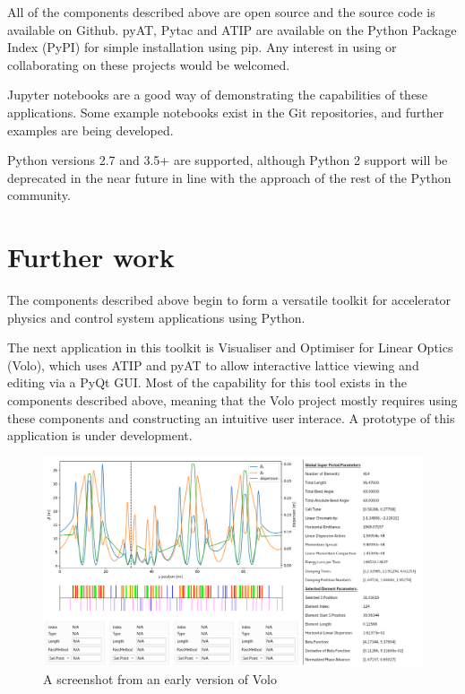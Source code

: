\documentclass[a4paper,
               keeplastbox,   %
               ]{jacow}
\begin{document}
All of the components described above are open source and the source code is available
on Github. pyAT, Pytac and ATIP are available on the Python Package Index (PyPI) \cite{pypi} 
for simple installation using pip. Any interest in using or collaborating on these 
projects would be welcomed.

Jupyter notebooks are a good way of demonstrating the capabilities of these applications.
Some example notebooks exist in the Git repositories, and further examples are being developed.

Python versions 2.7 and 3.5+ are supported, although Python 2 support will be deprecated
in the near future in line with the approach of the rest of the Python community.

\section{Further work}

The components described above begin to form a versatile toolkit for accelerator
physics and control system applications using Python. 

The next application in this toolkit is Visualiser and Optimiser for Linear Optics
(Volo), which uses ATIP and pyAT to allow interactive lattice viewing and editing
via a PyQt GUI. Most of the capability for this tool exists in the components
described above, meaning that the Volo project mostly requires using these components
and constructing an intuitive user interace. A prototype of this application is under
development.

\begin{figure}[!hbt]
    \centering
    \includegraphics*[width=\columnwidth]{MOPHA017f2}
    \caption{A screenshot from an early version of Volo}
    \label{fig:volo}
\end{figure}
\end{document}
